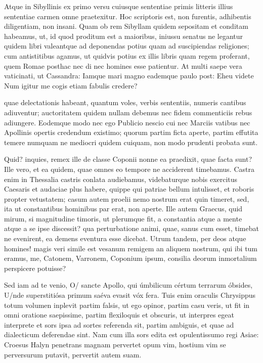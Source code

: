  Atque in Sibyllinis ex primo versu cuiusque sententiae primis litteris illius sententiae carmen omne praetexitur. Hoc scriptoris est, non furentis, adhibentis diligentiam, non insani. Quam ob rem Sibyllam quidem sepositam et conditam habeamus, ut, id quod proditum est a maioribus, iniussu senatus ne legantur quidem libri valeantque ad deponendas potius quam ad suscipiendas religiones; cum antistitibus agamus, ut quidvis potius ex illis libris quam regem proferant, quem Romae posthac nec di nec homines esse patientur. At multi saepe vera vaticinati, ut Cassandra: Iamque mari magno eademque paulo post: Eheu videte Num igitur me cogis etiam fabulis credere?

 quae delectationis habeant, quantum voles, verbis sententiis, numeris cantibus adiuventur; auctoritatem quidem nullam debemus nec fidem commenticiis rebus adiungere. Eodemque modo nec ego Publicio nescio cui nec Marciis vatibus nec Apollinis opertis credendum existimo; quorum partim ficta aperte, partim effutita temere numquam ne mediocri quidem cuiquam, non modo prudenti probata sunt.

 Quid? inquies, remex ille de classe Coponii nonne ea praedixit, quae facta sunt? Ille vero, et ea quidem, quae omnes eo tempore ne acciderent timebamus. Castra enim in Thessalia castris conlata audiebamus, videbaturque nobis exercitus Caesaris et audaciae plus habere, quippe qui patriae bellum intulisset, et roboris propter vetustatem; casum autem proelii nemo nostrum erat quin timeret, sed, ita ut constantibus hominibus par erat, non aperte. Ille autem Graecus, quid mirum, si magnitudine timoris, ut plerumque fit, a constantia atque a mente atque a se ipse discessit? qua perturbatione animi, quae, sanus cum esset, timebat ne evenirent, ea demens eventura esse dicebat. Utrum tandem, per deos atque homines! magis veri simile est vesanum remigem an aliquem nostrum, qui ibi tum eramus, me, Catonem, Varronem, Coponium ipsum, consilia deorum inmortalium perspicere potuisse?

 Sed iam ad te venio, O/ sancte Apollo, qui úmbilicum cértum terrarum óbsides, U/nde superstitiósa primum saéva evasit vóx fera. Tuis enim oraculis Chrysippus totum volumen inplevit partim falsis, ut ego opinor, partim casu veris, ut fit in omni oratione saepissime, partim flexiloquis et obscuris, ut interpres egeat interprete et sors ipsa ad sortes referenda sit, partim ambiguis, et quae ad dialecticum deferendae sint. Nam cum illa sors edita est opulentissumo regi Asiae: Croesus Halyn penetrans magnam pervertet opum vim, hostium vim se perversurum putavit, pervertit autem suam.

